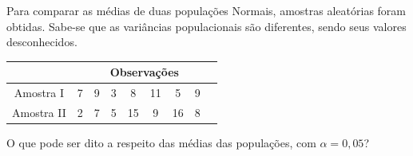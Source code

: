 %
%


\begin{exercicioBanco}[\valorquestao]
    Para comparar as médias de duas populações Normais, amostras aleatórias foram obtidas. Sabe-se que as variâncias populacionais são diferentes, sendo seus valores desconhecidos.

    \begin{center}
    \begin{tabular}{|c|cccccccc|}
        \hline
        & \multicolumn{8}{c|}{Observações} \\
        \hline
        Amostra I  & 7 & 9 & 3 & 8 & 11 & 5 & 9 & {} \\
        Amostra II & 2 & 7 & 5 & 15 & 9 & 16 & 8 & {} \\
        \hline
    \end{tabular}
    \end{center}

    O que pode ser dito a respeito das médias das populações, com
    \(\alpha = 0{,}05\)?
\end{exercicioBanco}

